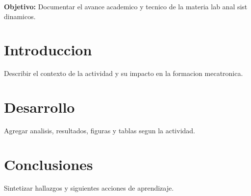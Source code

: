 \documentclass[spanish,letterpaper,oneside]{article}
\begin{document}
\templatePortrait
\templatePagecfg
\onehalfspacing

\begin{abstractd}
\textbf{Objetivo:} Documentar el avance academico y tecnico de la materia lab anal sist dinamicos.
\end{abstractd}

\templateIndex
\templateFinalcfg

\section{Introduccion}
Describir el contexto de la actividad y su impacto en la formacion mecatronica.

\section{Desarrollo}
Agregar analisis, resultados, figuras y tablas segun la actividad.

\section{Conclusiones}
Sintetizar hallazgos y siguientes acciones de aprendizaje.



\end{document}
